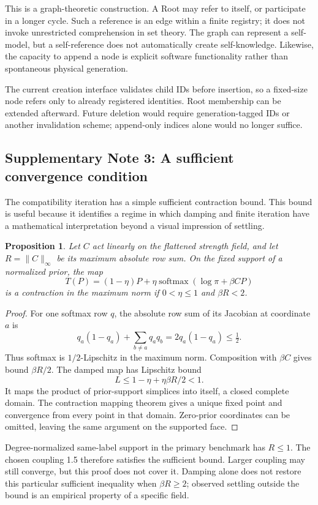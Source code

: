 \documentclass[10pt,a4paper]{article}
\newtheorem{proposition}{Proposition}
\begin{document}
This is a graph-theoretic construction. A Root may refer to itself, or participate in a longer cycle. Such a reference is an edge within a finite registry; it does not invoke unrestricted comprehension in set theory. The graph can represent a self-model, but a self-reference does not automatically create self-knowledge. Likewise, the capacity to append a node is explicit software functionality rather than spontaneous physical generation.

The current creation interface validates child IDs before insertion, so a fixed-size node refers only to already registered identities. Root membership can be extended afterward. Future deletion would require generation-tagged IDs or another invalidation scheme; append-only indices alone would no longer suffice.

\subsection*{Supplementary Note 3: A sufficient convergence condition}
The compatibility iteration has a simple sufficient contraction bound. This bound is useful because it identifies a regime in which damping and finite iteration have a mathematical interpretation beyond a visual impression of settling.

\begin{proposition}
Let $C$ act linearly on the flattened strength field, and let $R=\|C\|_\infty$ be its maximum absolute row sum. On the fixed support of a normalized prior, the map
\[
T(P)=(1-\eta)P+\eta\operatorname{softmax}(\log\pi+\beta CP)
\]
is a contraction in the maximum norm if $0<\eta\leq1$ and $\beta R<2$.
\end{proposition}
\begin{proof}
For one softmax row $q$, the absolute row sum of its Jacobian at coordinate $a$ is
\[
q_a(1-q_a)+\sum_{b\neq a}q_aq_b=2q_a(1-q_a)\leq\tfrac12.
\]
Thus softmax is $1/2$-Lipschitz in the maximum norm. Composition with $\beta C$ gives bound $\beta R/2$. The damped map has Lipschitz bound
\[
L\leq1-\eta+\eta\beta R/2<1.
\]
It maps the product of prior-support simplices into itself, a closed complete domain. The contraction mapping theorem gives a unique fixed point and convergence from every point in that domain. Zero-prior coordinates can be omitted, leaving the same argument on the supported face.
\end{proof}

Degree-normalized same-label support in the primary benchmark has $R\leq1$. The chosen coupling 1.5 therefore satisfies the sufficient bound. Larger coupling may still converge, but this proof does not cover it. Damping alone does not restore this particular sufficient inequality when $\beta R\geq2$; observed settling outside the bound is an empirical property of a specific field.
\end{document}
